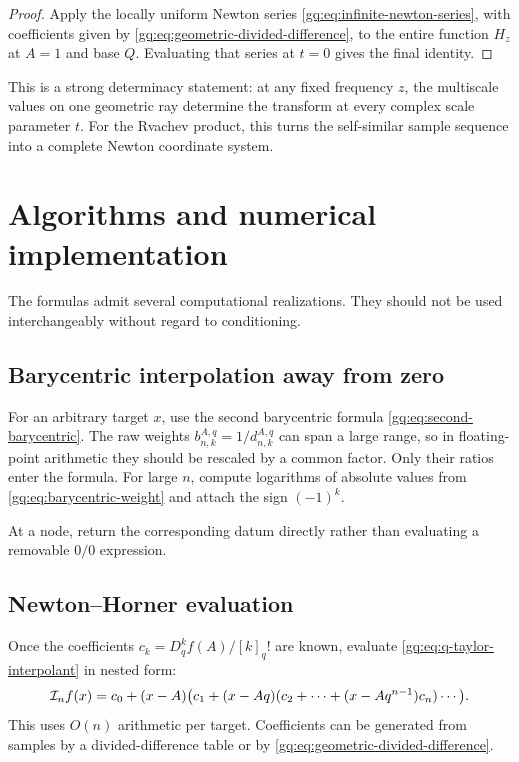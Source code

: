 \begin{proof}
Apply the locally uniform Newton series
\eqref{gq:eq:infinite-newton-series}, with coefficients given by
\eqref{gq:eq:geometric-divided-difference}, to the entire function $H_z$
at $A=1$ and base $Q$.  Evaluating that series at $t=0$ gives the final
identity.
\end{proof}

This is a strong determinacy statement: at any fixed frequency $z$, the
multiscale values on one geometric ray determine the transform at every complex
scale parameter $t$.  For the Rvachev product, this turns the self-similar
sample sequence into a complete Newton coordinate system.

\section{Algorithms and numerical implementation}
\label{g1:sec:algorithms}

The formulas admit several computational realizations.  They should not be
used interchangeably without regard to conditioning.

\subsection{Barycentric interpolation away from zero}

For an arbitrary target $x$, use the second barycentric formula
\eqref{gq:eq:second-barycentric}.  The raw weights
$b_{n,k}^{A,q}=1/d_{n,k}^{A,q}$ can span a large range, so in floating-point
arithmetic they should be rescaled by a common factor.  Only their ratios enter
the formula.  For large $n$, compute logarithms of absolute values from
\eqref{gq:eq:barycentric-weight} and attach the sign $(-1)^k$.

At a node, return the corresponding datum directly rather than evaluating a
removable $0/0$ expression.

\subsection{Newton--Horner evaluation}

Once the coefficients
$c_k=D_q^kf(A)/[k]_q!$ are known, evaluate
\eqref{gq:eq:q-taylor-interpolant} in nested form:
\begin{equation}
 \mathcal I_nf(x)=c_0+(x-A)\bigl(c_1+(x-Aq)
 (c_2+\cdots+(x-Aq^{n-1})c_n)\cdots\bigr).
 \label{g1:eq:Newton-Horner}
\end{equation}
This uses $O(n)$ arithmetic per target.  Coefficients can be generated from
samples by a divided-difference table or by
\eqref{gq:eq:geometric-divided-difference}.

